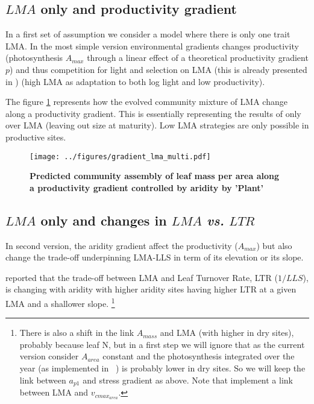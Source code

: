 \documentclass[a4paper,11pt]{article}
\begin{document}
\subsection{$LMA$ only and productivity gradient}

In a first set of assumption we consider a model where there is only one trait LMA. In the most simple version environmental gradients changes productivity (photosynthesis $A_{max}$ through a linear effect of a theoretical productivity gradient $p$) and
thus competition for light and selection on LMA (this is already presented in \citet{Falster-2017}) (high LMA as adaptation to both log light and low productivity).

The figure \ref{fig:lma} represents how the evolved community mixture of LMA change along a productivity gradient. This is essentially representing the results of \citet{Falster-2017} only over LMA (leaving out size at maturity). Low LMA strategies are only possible in productive sites.

\begin{figure}[ht]
\centering
\texttt{[image: ../figures/gradient\_lma\_multi.pdf]}
\caption{\textbf{Predicted community assembly of leaf mass per area along a productivity gradient controlled by aridity by 'Plant' \citep[see][]{Falster-2016}}
\label{fig:lma}}
\end{figure}

\clearpage

\subsection{$LMA$ only and changes in $LMA$ \textit{vs.} $LTR$}

In second version, the aridity gradient affect the productivity ($A_{max}$) but also change the trade-off underpinning LMA-LLS in term of its elevation or its slope.

\citet{Wright-2005} reported that the trade-off between LMA and Leaf Turnover Rate, LTR ($1/LLS$), is changing with aridity with higher aridity sites having higher LTR at a given LMA and a shallower slope. \footnote{There is also a shift in the link $A_{mass}$ and LMA (with higher in dry sites), probably because leaf N, but in a first step we will ignore that as the current version consider $A_{area}$ constant and the photosynthesis integrated over the year (as implemented in \plant\ ) is probably lower in dry sites. So we will keep the link between $a_{p1}$ and stress gradient as above. Note that \citet{Sakschewski-2015} implement a link between LMA and $v_{cmax_{area}}$.}
\end{document}
